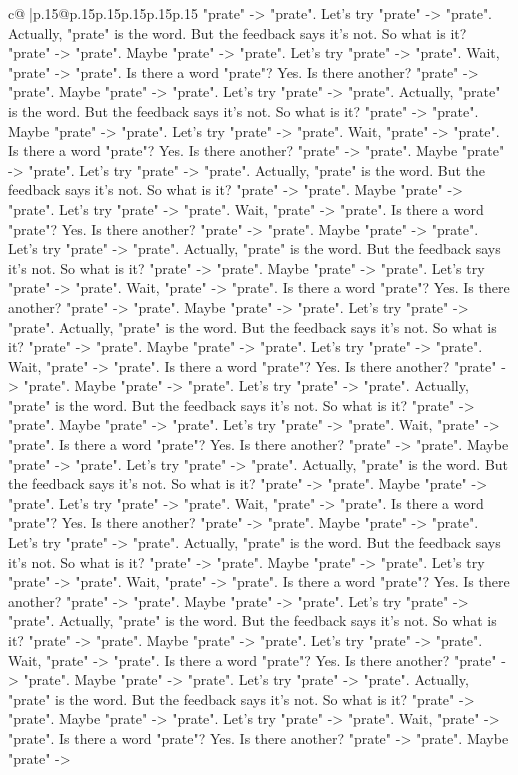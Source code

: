 \documentclass{article}
\begin{document}
{\begin{supertabular}{c@{$\;$}|p{.15\linewidth}@{}p{.15\linewidth}p{.15\linewidth}p{.15\linewidth}p{.15\linewidth}p{.15\linewidth}}
{{{"prate" {-}> "prate". Let's try "prate" {-}> "prate". Actually, "prate" is the word. But the feedback says it's not. So what is it? "prate" {-}> "prate". Maybe "prate" {-}> "prate". Let's try "prate" {-}> "prate". Wait, "prate" {-}> "prate". Is there a word "prate"? Yes. Is there another? "prate" {-}> "prate". Maybe "prate" {-}> "prate". Let's try "prate" {-}> "prate". Actually, "prate" is the word. But the feedback says it's not. So what is it? "prate" {-}> "prate". Maybe "prate" {-}> "prate". Let's try "prate" {-}> "prate". Wait, "prate" {-}> "prate". Is there a word "prate"? Yes. Is there another? "prate" {-}> "prate". Maybe "prate" {-}> "prate". Let's try "prate" {-}> "prate". Actually, "prate" is the word. But the feedback says it's not. So what is it? "prate" {-}> "prate". Maybe "prate" {-}> "prate". Let's try "prate" {-}> "prate". Wait, "prate" {-}> "prate". Is there a word "prate"? Yes. Is there another? "prate" {-}> "prate". Maybe "prate" {-}> "prate". Let's try "prate" {-}> "prate". Actually, "prate" is the word. But the feedback says it's not. So what is it? "prate" {-}> "prate". Maybe "prate" {-}> "prate". Let's try "prate" {-}> "prate". Wait, "prate" {-}> "prate". Is there a word "prate"? Yes. Is there another? "prate" {-}> "prate". Maybe "prate" {-}> "prate". Let's try "prate" {-}> "prate". Actually, "prate" is the word. But the feedback says it's not. So what is it? "prate" {-}> "prate". Maybe "prate" {-}> "prate". Let's try "prate" {-}> "prate". Wait, "prate" {-}> "prate". Is there a word "prate"? Yes. Is there another? "prate" {-}> "prate". Maybe "prate" {-}> "prate". Let's try "prate" {-}> "prate". Actually, "prate" is the word. But the feedback says it's not. So what is it? "prate" {-}> "prate". Maybe "prate" {-}> "prate". Let's try "prate" {-}> "prate". Wait, "prate" {-}> "prate". Is there a word "prate"? Yes. Is there another? "prate" {-}> "prate". Maybe "prate" {-}> "prate". Let's try "prate" {-}> "prate". Actually, "prate" is the word. But the feedback says it's not. So what is it? "prate" {-}> "prate". Maybe "prate" {-}> "prate". Let's try "prate" {-}> "prate". Wait, "prate" {-}> "prate". Is there a word "prate"? Yes. Is there another? "prate" {-}> "prate". Maybe "prate" {-}> "prate". Let's try "prate" {-}> "prate". Actually, "prate" is the word. But the feedback says it's not. So what is it? "prate" {-}> "prate". Maybe "prate" {-}> "prate". Let's try "prate" {-}> "prate". Wait, "prate" {-}> "prate". Is there a word "prate"? Yes. Is there another? "prate" {-}> "prate". Maybe "prate" {-}> "prate". Let's try "prate" {-}> "prate". Actually, "prate" is the word. But the feedback says it's not. So what is it? "prate" {-}> "prate". Maybe "prate" {-}> "prate". Let's try "prate" {-}> "prate". Wait, "prate" {-}> "prate". Is there a word "prate"? Yes. Is there another? "prate" {-}> "prate". Maybe "prate" {-}> "prate". Let's try "prate" {-}> "prate". Actually, "prate" is the word. But the feedback says it's not. So what is it? "prate" {-}> "prate". Maybe "prate" {-}> "prate". Let's try "prate" {-}> "prate". Wait, "prate" {-}> "prate". Is there a word "prate"? Yes. Is there another? "prate" {-}> "prate". Maybe "prate" {-}> }}}
\end{supertabular}}
\end{document}
